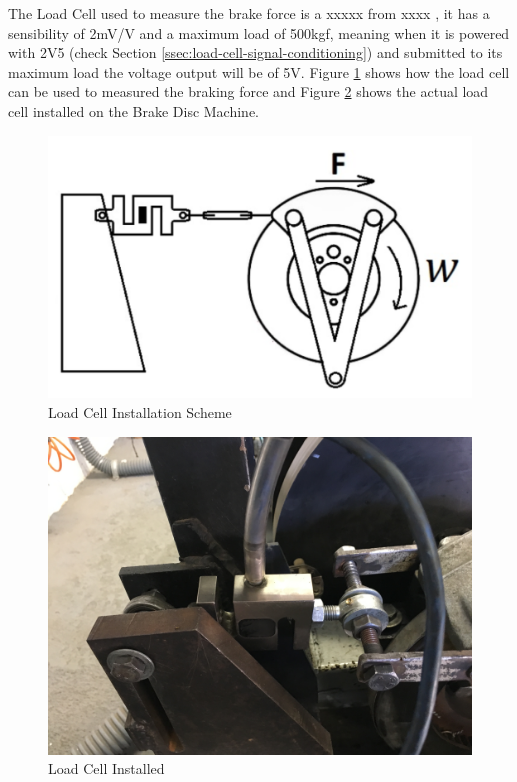 		The Load Cell used to measure the brake force is a xxxxx from xxxx \cite{load-cell}, it has a sensibility of 2mV/V and a maximum load of 500kgf, meaning when it is powered with 2V5 (check Section \ref{ssec:load-cell-signal-conditioning}) and submitted to its maximum load the voltage output will be of 5V. Figure \ref{fig:load-cell-installation-scheme} shows how the load cell can be used to measured the braking force and Figure \ref{fig:load-cell-installed} shows the actual load cell installed on the Brake Disc Machine.

		\begin{figure}[htbp]
			\centering
			\includegraphics[scale=0.7]{figuras/fig-load-cell-installation-scheme}
			\caption{Load Cell Installation Scheme \cite{load-cell-caxeta2017}}
			\label{fig:load-cell-installation-scheme}
		\end{figure}

		\begin{figure}[htbp]
			\centering
			\includegraphics[scale=0.7]{figuras/fig-load-cell-installed}
			\caption{Load Cell Installed}
			\label{fig:load-cell-installed}
		\end{figure}
		\par

